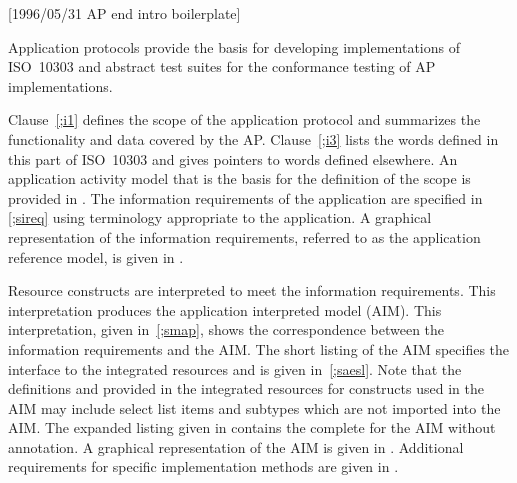 [1996/05/31 AP end intro boilerplate]

    Application protocols provide the basis for developing
implementations of ISO~10303 and abstract test suites for
the conformance testing of AP implementations.

    Clause~\ref{;i1} defines the scope of the application protocol
and summarizes  the functionality and data covered by the AP.
Clause~\ref{;i3} lists the words defined in this part of ISO~10303 and
gives pointers to words defined elsewhere.
An application activity model that is the basis for the definition
of the scope is provided in . The information requirements
of the application are specified in \cref{;sireq} using terminology
appropriate to the application. A graphical representation of the
information requirements, referred to as the application reference
model, is given in .

    Resource constructs are interpreted to meet the information
requirements. This interpretation produces the application
interpreted model (AIM). This interpretation, given in~\ref{;smap}, shows
the correspondence between the information requirements and the
AIM. The short listing of the AIM specifies the interface to the
integrated resources and is given in~\ref{;saesl}. Note that the definitions
and \Express{} provided in the integrated resources for constructs
used in the AIM may include select list items and subtypes which are
not imported into the AIM. The expanded listing given in 
contains the complete \Express{} for the AIM without annotation. A
graphical representation of the AIM is given in . Additional
requirements for specific implementation methods are given in
.

\endinput
